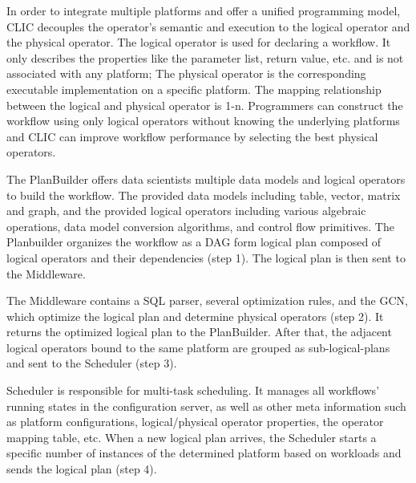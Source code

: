 In order to integrate multiple platforms and offer a unified programming model, CLIC decouples the operator’s semantic and execution to the logical operator and the physical operator. The logical operator is used for declaring a workflow. It only describes the properties like the parameter list, return value, etc. and is not associated with any platform; The physical operator is the corresponding executable implementation on a specific platform. The mapping relationship between the logical and physical operator is 1-n. Programmers can construct the workflow using only logical operators without knowing the underlying platforms and CLIC can improve workflow performance by selecting the best physical operators.

The PlanBuilder offers data scientists multiple data models and logical operators to build the workflow. The provided data models including table, vector, matrix and graph, and the provided logical operators including various algebraic operations, data model conversion algorithms, and control flow primitives. The Planbuilder organizes the workflow as a DAG form logical plan composed of logical operators and their dependencies (step 1). The logical plan is then sent to the Middleware.

The Middleware contains a SQL parser, several optimization rules, and the GCN, which optimize the logical plan and determine physical operators (step 2). It returns the optimized logical plan to the PlanBuilder. After that, the adjacent logical operators bound to the same platform are grouped as sub-logical-plans and sent to the Scheduler (step 3). 

Scheduler is responsible for multi-task scheduling. It manages all workflows’ running states in the configuration server, as well as other meta information such as platform configurations, logical/physical operator properties, the operator mapping table, etc. When a new logical plan arrives, the Scheduler starts a specific number of instances of the determined platform based on workloads and sends the logical plan (step 4). 
\fi




